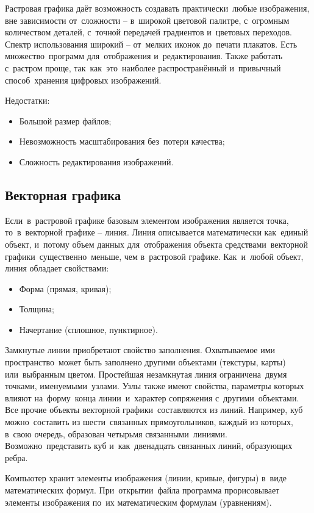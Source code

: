 \documentclass{ou}
\begin{document}
Растровая графика даёт возможность создавать практически~любые изображения, вне зависимости от~сложности -- в~широкой цветовой палитре, с~огромным количеством деталей, с~точной передачей градиентов и~цветовых переходов. Спектр использования широкий -- от~мелких иконок до~печати плакатов. Есть множество~программ для~отображения и~редактирования. Также работать с~растром проще, так~как~это~наиболее распространённый и~привычный способ~хранения цифровых изображений.

Недостатки:
\begin{itemize}[label=-, itemindent=2em, nosep]
\item Большой размер файлов;
\item Невозможность масштабирования без~потери качества;
\item Сложность редактирования изображений.
\end{itemize}
\subsection{Векторная графика}
Если~в~растровой графике базовым элементом изображения является точка, то~в~векторной графике -- линия. Линия описывается математически как~единый объект, и~потому объем данных для~отображения объекта средствами~векторной графики~существенно~меньше, чем в~растровой графике. Как~и~любой объект, линия обладает свойствами:
\begin{itemize}[label=-, itemindent=2em, nosep]
\item Форма (прямая, кривая);
\item Толщина;
\item Начертание (сплошное, пунктирное).
\end{itemize}

Замкнутые линии приобретают свойство заполнения. Охватываемое ими пространство~может быть заполнено другими объектами (текстуры, карты) или~выбранным цветом. Простейшая незамкнутая линия ограничена~двумя точками, именуемыми~узлами. Узлы также имеют свойства, параметры которых влияют на~форму~конца линии~и~характер сопряжения с~другими~объектами. Все прочие объекты векторной графики~составляются из линий. Например, куб можно~составить из шести~связанных прямоугольников, каждый из которых, в~свою очередь, образован четырьмя связанными~линиями. Возможно~представить куб и~как~двенадцать связанных линий, образующих ребра.

Компьютер хранит элементы изображения (линии, кривые, фигуры) в~виде математических формул. При~открытии~файла программа прорисовывает элементы изображения по~их математическим формулам (уравнениям).
\end{document}
